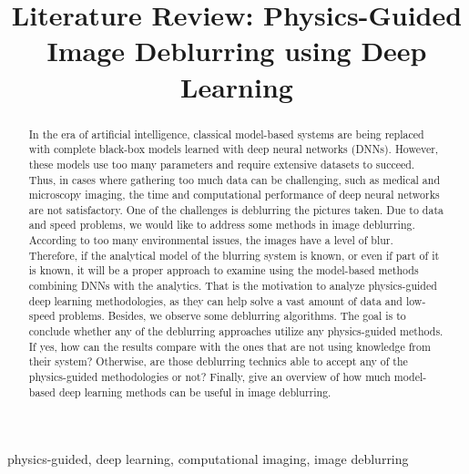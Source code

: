 \documentclass[conference, 11pt]{IEEEtran}
\begin{document}
	
	\title{Literature Review: Physics-Guided Image Deblurring using Deep Learning}
	
	\author{
		}
	
	
	\maketitle
	
	\begin{abstract}
		
		In the era of artificial intelligence, classical model-based systems are being replaced with complete black-box models learned with deep neural networks (DNNs). However, these models use too many parameters and require extensive datasets to succeed. Thus, in cases where gathering too much data can be challenging, such as medical and microscopy imaging, the time and computational performance of deep neural networks are not satisfactory. One of the challenges is deblurring the pictures taken. Due to data and speed problems, we would like to address some methods in image deblurring. According to too many environmental issues, the images have a level of blur. Therefore, if the analytical model of the blurring system is known, or even if part of it is known, it will be a proper approach to examine using the model-based methods combining DNNs with the analytics. That is the motivation to analyze physics-guided deep learning methodologies, as they can help solve a vast amount of data and low-speed problems. Besides, we observe some deblurring algorithms. The goal is to conclude whether any of the deblurring approaches utilize any physics-guided methods. If yes, how can the results compare with the ones that are not using knowledge from their system? Otherwise, are those deblurring technics able to accept any of the physics-guided methodologies or not? Finally, give an overview of how much model-based deep learning methods can be useful in image deblurring.
		
	\end{abstract}
	
	\begin{IEEEkeywords}
		physics-guided, deep learning, computational imaging, image deblurring
	\end{IEEEkeywords}
	
\end{document}
